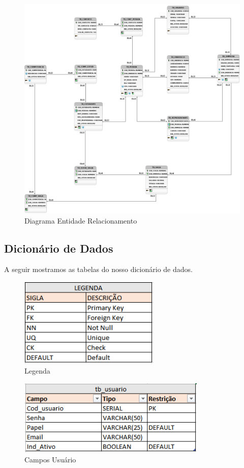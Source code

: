 \begin{figure}[H]
	\centering 
	\caption{\label{fig:der}Diagrama Entidade Relacionamento}
	\includegraphics[width=\textwidth]{../imagens/der-estagiei.png} 
\end{figure}

\subsection{Dicionário de Dados}
A seguir mostramos as tabelas do nosso dicionário de dados.

\begin{figure}[H]
	\centering 
	\caption{\label{fig:dicio-leg}Legenda}
	\includegraphics[width=0.6\textwidth]{../imagens/dicio-legenda.png} 
\end{figure}

\begin{figure}[H]
	\centering 
	\caption{\label{fig:dicio-user}Campos Usuário}
	\includegraphics[width=0.8\textwidth]{../imagens/dicio-tb-usuario.png}
\end{figure}

